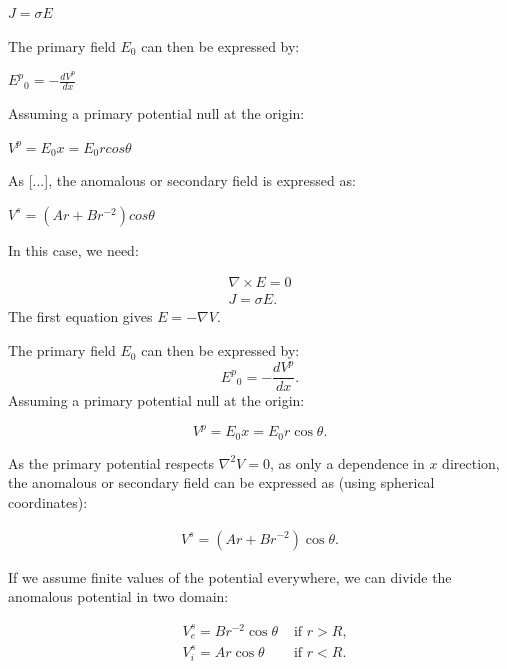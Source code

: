 \documentclass[11pt,letterpaper,leqno]{amsart}
\numberwithin{equation}{section}
\begin{document}
$J=\sigma E$

The primary field $E_0$ can then be expressed by:

${E^p}_0=-\frac{dV^p}{dx}$

Assuming a primary potential null at the origin:

$V^p=E_0x=E_0 r cos\theta$

As [...], the anomalous or secondary field is expressed as:

$V^s=(A r + B r^{-2}) cos\theta$

\vspace{0.4cm}

 \vspace{0.4cm}



In this case, we need:

\begin{equation}
\begin{aligned}
\nabla \times E =0\\
J=\sigma E.
\end{aligned}
\end{equation}
The first equation gives $E=-\nabla V$.


The primary field $E_0$ can then be expressed by:
\begin{equation}
{E^p}_0=-\frac{dV^p}{dx}.
\end{equation}
Assuming a primary potential null at the origin:

 \begin{equation}
V^p=E_0x=E_0 r \cos\theta.
\end{equation}



As the primary potential respects $\nabla^2 V=0 $, as only a dependence in $x$ direction, the anomalous or secondary field can be expressed as (using spherical coordinates):

\begin{equation}
\begin{aligned}
V^s=(A r + B r^{-2}) \cos\theta.
\end{aligned}
\end{equation}


If we assume finite  values of the potential everywhere, we can divide the anomalous potential in two domain:


\begin{equation}
\begin{aligned}
&V^s_e=B r^{-2} \cos\theta  & \text{ if } r>R, \\
&V^s_i=A r \cos\theta & \text{ if }  r<R.
\end{aligned}
\end{equation}
\end{document}
